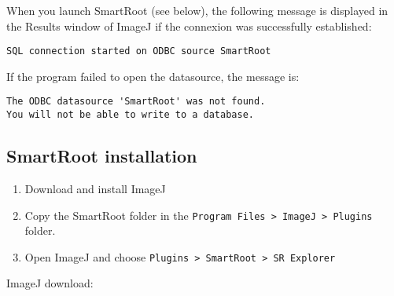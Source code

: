 When you launch SmartRoot (see below), the following message is displayed in the Results window of ImageJ if the connexion was successfully established:

\begin{Verbatim}[frame=single, commandchars=+\(\)]
SQL connection started on ODBC source SmartRoot
\end{Verbatim}

If the program failed to open the datasource, the message is:

\begin{Verbatim}[frame=single, commandchars=+\(\)]
The ODBC datasource 'SmartRoot' was not found.
You will not be able to write to a database.
\end{Verbatim}

{\color{coolSubSection}\subsection{SmartRoot installation\\}}

\begin{enumerate}
\item Download and install ImageJ 
\item Copy the SmartRoot folder in the \verb|Program Files > ImageJ > Plugins| folder.
\item Open ImageJ and choose \verb|Plugins > SmartRoot > SR Explorer|\\
\end{enumerate}

\noindent ImageJ download:\\

\noindent{}\\\\

\noindent
{}\\

